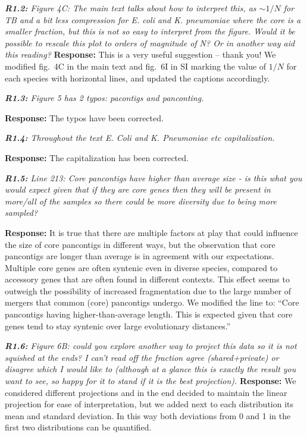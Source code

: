 \documentclass[aps,rmp,onecolumn]{revtex4-1}
\newcommand{\reviewer}[2]{{\it \textbf{#1:} #2\vskip 5mm}}
\newcommand{\response}[1]{{{\color{response}\textbf{Response:} #1}}\vskip 5mm}
\newcommand{\SIfigBenchmark}{6}
\begin{document}
\reviewer{R1.2}{Figure 4C: The main text talks about how to interpret this, as $\sim 1/N$ for TB and a bit less compression for E. coli and K. pneumoniae where the core is a smaller fraction, but this is not so easy to interpret from the figure. Would it be possible to rescale this plot to orders of magnitude of N? Or in another way aid this reading?}
\response{This is a very useful suggestion -- thank you! We modified fig.~4C in the main text and fig.~{\SIfigBenchmark}I in SI marking the value of $1/N$ for each species with horizontal lines, and updated the captions accordingly.}

\reviewer{R1.3}{Figure 5 has 2 typos: pacontigs and panconting.}

\response{The typos have been corrected.}

\reviewer{R1.4}{Throughout the text E. Coli and K. Pneumoniae etc capitalization.}

\response{The capitalization has been corrected.}

\reviewer{R1.5}{Line 213: Core pancontigs have higher than average size - is this what you would expect given that if they are core genes then they will be present in more/all of the samples so there could be more diversity due to being more sampled?}

\response{It is true that there are multiple factors at play that could influence the size of core pancontigs in different ways, but the observation that core pancontigs are longer than average is in agreement with our expectations. Multiple core genes are often syntenic even in diverse species, compared to accessory genes that are often found in different contexts. This effect seems to outweigh the possibility of increased fragmentation due to the large number of mergers that common (core) pancontigs undergo.
We modified the line to: ``Core pancontigs having higher-than-average length. This is expected given that core genes tend to stay syntenic over large evolutionary distances.''}

\reviewer{R1.6}{Figure 6B: could you explore another way to project this data so it is not squished at the ends? I can't read off the fraction agree (shared+private) or disagree which I would like to (although at a glance this is exactly the result you want to see, so happy for it to stand if it is the best projection).}
\response{We considered different projections and in the end decided to maintain the linear projection for ease of interpretation, but we added next to each distribution its mean and standard deviation. In this way both deviations from 0 and 1 in the first two distributions can be quantified.}
\end{document}
